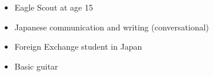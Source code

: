 \begin{itemize}
  \item Eagle Scout at age 15
  \item Japanese communication and writing (conversational)
  \item Foreign Exchange student in Japan
  \item Basic guitar
\end{itemize}
